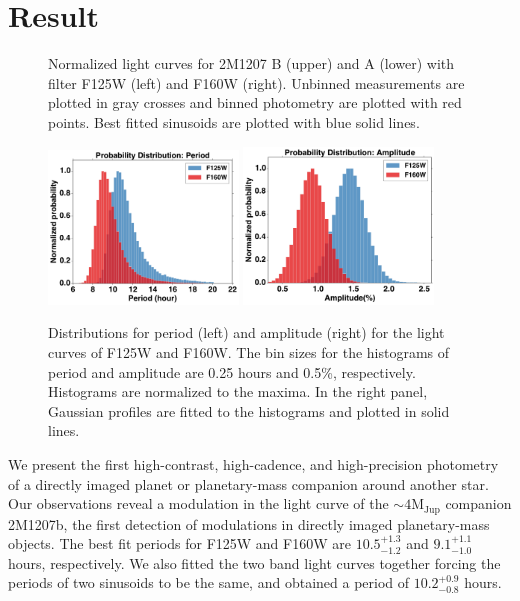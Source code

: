 \documentclass[apj]{emulateapj}
\begin{document}
\section{Result}
\label{Results}

\begin{figure}
  \centering
  \caption{Normalized light curves for 2M1207 B (upper) and A (lower)
    with filter F125W (left) and F160W (right). Unbinned
  measurements are plotted in gray crosses and binned photometry are
  plotted with red points. Best fitted sinusoids are plotted
  with blue solid lines.}
  \label{fig:3}
\end{figure}

\begin{figure}
  \centering
  \includegraphics[width=0.45\textwidth]{f4a}
  \includegraphics[width=0.45\textwidth]{f4b}

  \caption{Distributions for period (left) and amplitude (right) for the light
    curves of F125W and F160W. The bin sizes for the histograms of
    period  and amplitude are
  0.25 hours and 0.5\%, respectively. Histograms are
  normalized to the maxima. In the right panel, Gaussian profiles are fitted to the
  histograms and plotted in solid lines.}
  \label{fig:4}
\end{figure}

We present the first high-contrast, high-cadence, and high-precision
photometry of a directly imaged planet or planetary-mass
companion around another star. Our observations reveal a modulation in the light curve of
the $\sim 4 \mathrm{M_{{Jup}}}$ companion 2M1207b, the first detection
of modulations in directly imaged planetary-mass objects.  The best
fit periods for F125W and F160W are $10.5_{-1.2}^{+1.3}$ and $9.1_{-1.0}^{+1.1}$ hours,
respectively. We also fitted the two band light curves together forcing the
periods of two sinusoids to be the same, and obtained a period
of $10.2^{+0.9}_{-0.8}$ hours. 
\end{document}
